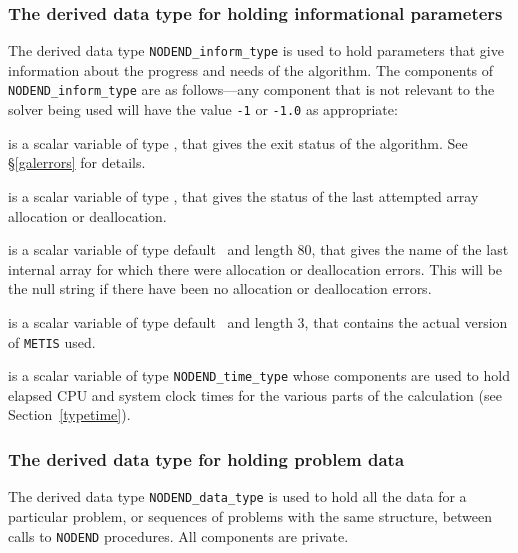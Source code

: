 \documentclass{galahad}
\newcommand{\packagename}{NODEND}
\begin{document}

\subsubsection{The derived data type for holding informational
 parameters}\label{typeinform}
The derived data type
{\tt \packagename\_inform\_type}
is used to hold parameters that give information about the progress and needs
of the algorithm. The components of
{\tt \packagename\_inform\_type}
are as follows---any component that is not relevant to the solver being used
will have the value {\tt -1} or {\tt -1.0} as appropriate:

\begin{description}

 is a scalar variable of type \integer, that gives the
exit status of the algorithm.
See \S\ref{galerrors}
for details.

 is a scalar variable of type \integer, that gives
the status of the last attempted array allocation or deallocation.

 is a scalar variable of type default \character\
and length 80, that  gives the name of the last internal array
for which there were allocation or deallocation errors.
This will be the null string if there have been no
allocation or deallocation errors.

 is a scalar variable of type default \character\
and length 3, that contains the actual version of {\tt METIS} used.

\ittf{time} is a scalar variable of type {\tt \packagename\_time\_type}
whose components are used to hold elapsed CPU and system clock times for the
various parts of the calculation (see Section~\ref{typetime}).

\end{description}


\subsubsection{The derived data type for holding problem data}\label{typedata}
The derived data type
{\tt \packagename\_data\_type}
is used to hold all the data for a particular problem,
or sequences of problems with the same structure, between calls to
{\tt \packagename} procedures.
All components are private.
\end{document}
